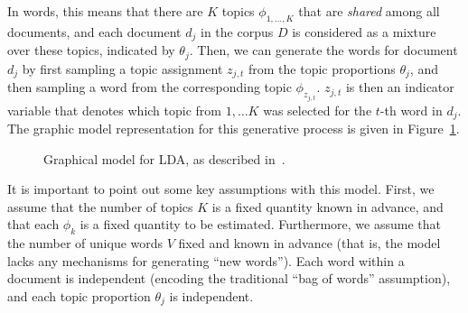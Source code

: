 \documentclass[11pt]{article}
\begin{document}
In words, this means that there are $K$ topics $\phi_{1,\ldots,K}$ that are
\emph{shared} among all documents, and each document $d_j$ in the corpus
$D$ is considered as a mixture over these topics, indicated by $\theta_j$.
Then, we can generate the words for document $d_j$ by first sampling a
topic assignment $z_{j,t}$ from the topic proportions $\theta_j$, and then
sampling a word from the corresponding topic $\phi_{z_{j,t}}$. $z_{j,t}$ is
then an indicator variable that denotes which topic from $1,\ldots K$ was
selected for the $t$-th word in $d_j$. The graphic model representation for
this generative process is given in Figure~\ref{fig:ldamodel}.

\begin{figure}[H]
  \begin{center}
  \end{center}
  \caption{Graphical model for LDA, as described in~\cite{Blei:2003:LDA}.}
  \label{fig:ldamodel}
\end{figure}

It is important to point out some key assumptions with this model. First,
we assume that the number of topics $K$ is a fixed quantity known in
advance, and that each $\phi_k$ is a fixed quantity to be estimated.
Furthermore, we assume that the number of unique words $V$ fixed and known
in advance (that is, the model lacks any mechanisms for generating ``new
words'').  Each word within a document is independent (encoding the
traditional ``bag of words'' assumption), and each topic proportion
$\theta_j$ is independent.
\end{document}
